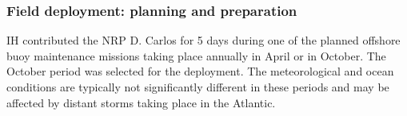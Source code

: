 



 
 



\subsubsection{Field deployment: planning and preparation}

IH contributed the NRP D. Carlos for 5 days during one of the planned
offshore buoy maintenance missions taking place annually in April or in
October. The October period was selected for the \proj deployment. The
meteorological and ocean conditions are typically not significantly
different in these periods and may be affected by distant storms taking
place in the Atlantic.

